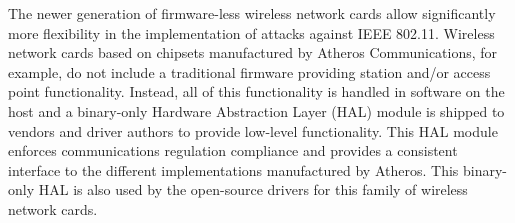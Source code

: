 \documentclass[10pt,twocolumn]{article}
\begin{document}




The newer generation of firmware-less wireless network cards allow
significantly more flexibility in the implementation of attacks
against IEEE 802.11.  Wireless network cards based on chipsets
manufactured by Atheros Communications, for example, do not include a
traditional firmware providing station and/or access point
functionality.  Instead, all of this functionality is handled in
software on the host and a binary-only Hardware Abstraction Layer
(HAL) module is shipped to vendors and driver authors to provide
low-level functionality.  This HAL module enforces communications
regulation compliance and provides a consistent interface to the
different implementations manufactured by Atheros.  This binary-only
HAL is also used by the open-source drivers for this family of
wireless network cards.
\end{document}
